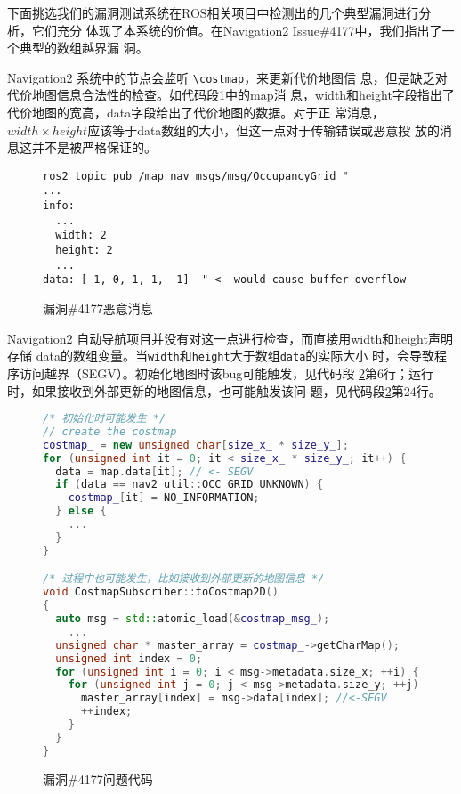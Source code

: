
下面挑选我们的漏洞测试系统在ROS相关项目中检测出的几个典型漏洞进行分析，它们充分
体现了本系统的价值。在Navigation2 Issue\#4177中，我们指出了一个典型的数组越界漏
洞。

Navigation2 系统中的节点会监听 \texttt{\textbackslash costmap}，来更新代价地图信
息，但是缺乏对代价地图信息合法性的检查。如代码段\ref{lst:bug:msg}中的map消
息，width和height字段指出了代价地图的宽高，data字段给出了代价地图的数据。对于正
常消息，$width\times height$应该等于data数组的大小，但这一点对于传输错误或恶意投
放的消息这并不是被严格保证的。

\begin{figure}[H]
\begin{lstlisting}[]
ros2 topic pub /map nav_msgs/msg/OccupancyGrid "
...
info:
  ...
  width: 2
  height: 2
  ...
data: [-1, 0, 1, 1, -1]  " <- would cause buffer overflow
\end{lstlisting}
  \caption{漏洞\#4177恶意消息}
\label{lst:bug:msg}
\end{figure}

Navigation2 自动导航项目并没有对这一点进行检查，而直接用width和height声明存储
data的数组变量。当\texttt{width}和\texttt{height}大于数组\texttt{data}的实际大小
时，会导致程序访问越界（SEGV）。初始化地图时该bug可能触发，见代码段
\ref{lst:bug:segv}第6行；运行时，如果接收到外部更新的地图信息，也可能触发该问
题，见代码段\ref{lst:bug:segv}第24行。

\begin{figure}[H]
\begin{lstlisting}[language=C++]
/* 初始化时可能发生 */
// create the costmap
costmap_ = new unsigned char[size_x_ * size_y_];
for (unsigned int it = 0; it < size_x_ * size_y_; it++) {
  data = map.data[it]; // <- SEGV
  if (data == nav2_util::OCC_GRID_UNKNOWN) {
    costmap_[it] = NO_INFORMATION;
  } else {
    ...
  }
}

/* 过程中也可能发生，比如接收到外部更新的地图信息 */
void CostmapSubscriber::toCostmap2D()
{
  auto msg = std::atomic_load(&costmap_msg_);
	...
  unsigned char * master_array = costmap_->getCharMap();
  unsigned int index = 0;
  for (unsigned int i = 0; i < msg->metadata.size_x; ++i) {
    for (unsigned int j = 0; j < msg->metadata.size_y; ++j) {
      master_array[index] = msg->data[index]; //<-SEGV
      ++index;
    }
  }
}
\end{lstlisting}
  \caption{漏洞\#4177问题代码}
\label{lst:bug:segv}
\end{figure}

